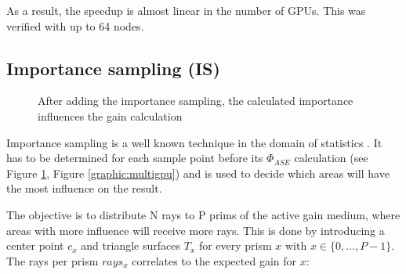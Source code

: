 As a result, the speedup is almost linear in the number of GPUs. This was
verified with up to 64 nodes.
    

\subsection{Importance sampling (IS)}
\label{subsec:importance_sampling}
\begin{figure}[H]
  \centerline
  {}
  \caption{After adding the importance sampling, the calculated importance 
  influences the gain calculation}
  \label{graphic:pap2}
\end{figure}
Importance sampling is a well known technique in the domain
of statistics \cite{importanceSamplingSource}. It has to be determined for each
sample point before its $\Phi_{ASE}$ calculation (see Figure \ref{graphic:pap2},
Figure \ref{graphic:multigpu}) and is used 
to decide which areas will have the most influence on the result.

The objective is to distribute N rays to P prims of the active gain medium, 
where areas with more influence will receive more rays.
This is done by introducing a center point $c_x$ and triangle surfaces $T_x$ for every prism $x$ with $x \in \{0,...,P-1\}$.
The rays per prism $rays_x$ correlates to the expected gain for $x$:


